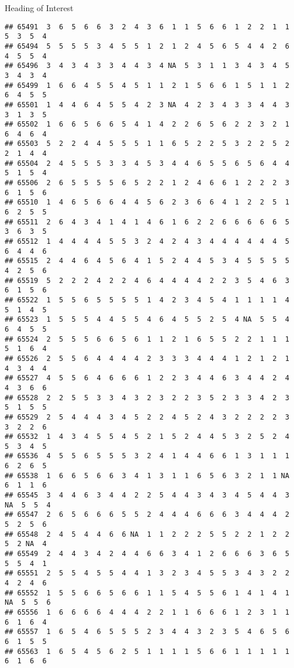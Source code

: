 \documentclass[
  ignorenonframetext,
]{beamer}
\begin{document}
\begin{frame}[fragile]{Heading of Interest}
\begin{verbatim}
## 65491  3  6  5  6  6  3  2  4  3  6  1  1  5  6  6  1  2  2  1  1  5  3  5  4
## 65494  5  5  5  5  3  4  5  5  1  2  1  2  4  5  6  5  4  4  2  6  4  5  5  4
## 65496  3  4  3  4  3  3  4  4  3  4 NA  5  3  1  1  3  4  3  4  5  3  4  3  4
## 65499  1  6  6  4  5  5  4  5  1  1  2  1  5  6  6  1  5  1  1  2  6  4  5  5
## 65501  1  4  4  6  4  5  5  4  2  3 NA  4  2  3  4  3  3  4  4  3  3  1  3  5
## 65502  1  6  6  5  6  6  5  4  1  4  2  2  6  5  6  2  2  3  2  1  6  4  6  4
## 65503  5  2  2  4  4  5  5  5  1  1  6  5  2  2  5  3  2  2  5  2  2  1  4  4
## 65504  2  4  5  5  5  3  3  4  5  3  4  4  6  5  5  6  5  6  4  4  5  1  5  4
## 65506  2  6  5  5  5  5  6  5  2  2  1  2  4  6  6  1  2  2  2  3  6  1  5  6
## 65510  1  4  6  5  6  6  4  4  5  6  2  3  6  6  4  1  2  2  5  1  6  2  5  5
## 65511  2  6  4  3  4  1  4  1  4  6  1  6  2  2  6  6  6  6  6  5  3  6  3  5
## 65512  1  4  4  4  4  5  5  3  2  4  2  4  3  4  4  4  4  4  4  5  6  4  4  6
## 65515  2  4  4  6  4  5  6  4  1  5  2  4  4  5  3  4  5  5  5  5  4  2  5  6
## 65519  5  2  2  2  4  2  2  4  6  4  4  4  4  2  2  3  5  4  6  3  6  1  5  6
## 65522  1  5  5  6  5  5  5  5  1  4  2  3  4  5  4  1  1  1  1  4  5  1  4  5
## 65523  1  5  5  5  4  4  5  5  4  6  4  5  5  2  5  4 NA  5  5  4  6  4  5  5
## 65524  2  5  5  5  6  6  5  6  1  1  2  1  6  5  5  2  2  1  1  1  5  1  6  4
## 65526  2  5  5  6  4  4  4  4  2  3  3  3  4  4  4  1  2  1  2  1  4  3  4  4
## 65527  4  5  5  6  4  6  6  6  1  2  2  3  4  4  6  3  4  4  2  4  4  3  6  6
## 65528  2  2  5  5  3  3  4  3  2  3  2  2  3  5  2  3  3  4  2  3  5  1  5  5
## 65529  2  5  4  4  4  3  4  5  2  2  4  5  2  4  3  2  2  2  2  3  3  2  2  6
## 65532  1  4  3  4  5  5  4  5  2  1  5  2  4  4  5  3  2  5  2  4  5  3  4  5
## 65536  4  5  5  6  5  5  5  3  2  4  1  4  4  6  6  1  3  1  1  1  6  2  6  5
## 65538  1  6  6  5  6  6  3  4  1  3  1  1  6  5  6  3  2  1  1 NA  6  1  1  6
## 65545  3  4  4  6  3  4  4  2  2  5  4  4  3  4  3  4  5  4  4  3 NA  5  5  4
## 65547  2  6  5  6  6  6  5  5  2  4  4  4  6  6  6  3  4  4  4  2  5  2  5  6
## 65548  2  4  5  4  4  6  6 NA  1  1  2  2  2  5  5  2  2  1  2  2  5  2 NA  4
## 65549  2  4  4  3  4  2  4  4  6  6  3  4  1  2  6  6  6  3  6  5  5  5  4  1
## 65551  2  5  5  4  5  5  4  4  1  3  2  3  4  5  5  3  4  3  2  2  4  2  4  6
## 65552  1  5  5  6  6  5  6  6  1  1  5  4  5  5  6  1  4  1  4  1 NA  5  5  6
## 65556  1  6  6  6  6  4  4  4  2  2  1  1  6  6  6  1  2  3  1  1  6  1  6  4
## 65557  1  6  5  4  6  5  5  5  2  3  4  4  3  2  3  5  4  6  5  6  6  1  5  5
## 65563  1  6  5  4  5  6  2  5  1  1  1  1  5  6  6  1  1  1  1  1  6  1  6  6

\end{verbatim}
\end{frame}
\end{document}
